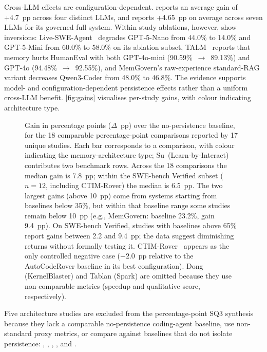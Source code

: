 Cross-LLM effects are configuration-dependent.
\citet{shen2026structurally} reports an average gain of +4.7~pp across
four distinct LLMs, and \citet{wang2026memgovern} reports +4.65~pp on
average across seven LLMs for its governed full system.
Within-study ablations, however, show inversions:
Live-SWE-Agent~\citep{xia2025livesweagent} degrades GPT-5-Nano from
44.0\% to 14.0\% and GPT-5-Mini from 60.0\% to 58.0\% on its ablation
subset,
TALM~\citep{shen2025talm} reports that memory hurts HumanEval with both
GPT-4o-mini (90.59\%~$\to$~89.13\%) and GPT-4o (94.48\%~$\to$~92.55\%),
and MemGovern's raw-experience standard-RAG variant decreases
Qwen3-Coder from 48.0\% to 46.8\%.
The evidence supports model- and configuration-dependent persistence
effects rather than a uniform cross-LLM benefit.
\autoref{fig:gains} visualises per-study gains, with colour indicating
architecture type.

\begin{figure}[!htbp]
  \centering
  
  \caption{Gain in percentage points ($\Delta$~pp) over the
    no-persistence baseline, for the 18 comparable
    percentage-point comparisons reported by 17 unique studies.
    Each bar corresponds to a comparison, with colour indicating
    the memory-architecture type;
    Su~(Learn-by-Interact) contributes two benchmark rows.
    Across the 18 comparisons the median gain is 7.8~pp; within
    the SWE-bench Verified subset ($n = 12$, including
    CTIM-Rover) the median is 6.5~pp.
    The two largest gains (above 10~pp) come from systems starting
    from baselines below 35\%, but within that baseline range some
    studies remain below 10~pp (e.g., MemGovern: baseline
    23.2\%, gain 9.4~pp).
    On SWE-bench Verified, studies with baselines above 65\%
    report gains between 2.2 and 9.4~pp; the data suggest
    diminishing returns without formally testing it.
    CTIM-Rover~\citep{lindenbauer2025ctimrover} appears as the only
    controlled negative case ($-2.0$~pp relative to the
    AutoCodeRover baseline in its best configuration).
    Dong (KernelBlaster) and Tablan (Spark) are omitted because
    they use non-comparable metrics (speedup and qualitative
    score, respectively).}
  \label{fig:gains}
\end{figure}

Five architecture studies are excluded from the percentage-point SQ3
synthesis because they lack a comparable no-persistence coding-agent
baseline, use non-standard proxy metrics, or compare against baselines
that do not isolate persistence:
\citet{bui2026opendev}, \citet{vasilopoulos2026codified},
\citet{qian2024iterative}, \citet{hosain2025xolver}, and
\citet{zhang2025accelopt}.

